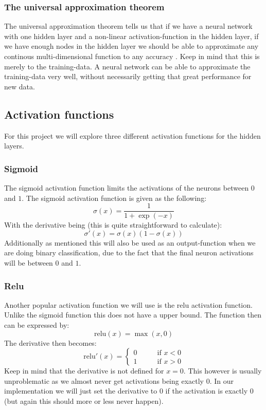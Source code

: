 \documentclass{article}
\begin{document}
\subsubsection{The universal approximation theorem}
\label{univ-approx-thm}
The universal approximation theorem tells us that if we have a neural network
with one hidden layer and a non-linear activation-function in the hidden layer,
if we have enough nodes in the hidden layer we should be able to approximate any
continous multi-dimensional function to any accuracy
\cite[s.~13.5]{lecutenotes13}. Keep in mind that this is merely to the
training-data. A neural network can be able to approximate the training-data
very well, without necessarily getting that great performance for new data.

\subsection{Activation functions}
For this project we will explore three different activation functions for the
hidden layers.
\subsubsection{Sigmoid}
The sigmoid activation function limits the activations of the neurons between
$0$ and $1$. The sigmoid activation function is given as the following:
$$\sigma(x) = \frac{1}{1 + \exp(-x)}$$
With the derivative being (this is quite straightforward to calculate):
$$\sigma'(x) = \sigma(x) (1 - \sigma(x))$$
Additionally as mentioned this will also be used as an output-function when we
are doing binary classification, due to the fact that the final neuron
activations will be between $0$ and $1$.

\subsubsection{Relu}
\label{relu-desc}
Another popular activation function we will use is the relu activation function.
Unlike the sigmoid function this does not have a upper bound. The function then
can be expressed by:
$$\text{relu}(x) = \max(x, 0)$$
The derivative then becomes:
$$\text{relu}'(x) = \begin{cases}
            0 \qquad & \text{if } x < 0 \\
            1        & \text{if } x > 0
      \end{cases}$$
Keep in mind that the derivative is not defined for $x=0$. This however is
usually unproblematic as we almost never get activations being exactly $0$. In
our implementation we will just set the derivative to $0$ if the activation is
exactly $0$ (but again this should more or less never happen).
\end{document}
